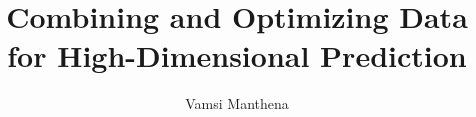 \documentclass[print]{nuthesis}
\begin{document}
\frontmatter

\title{Combining and Optimizing Data for High-Dimensional Prediction}
\author{Vamsi Manthena}
\maketitle








\tableofcontents

\listoffigures
\listoftables

\mainmatter






\backmatter

\appendix







\end{document}
